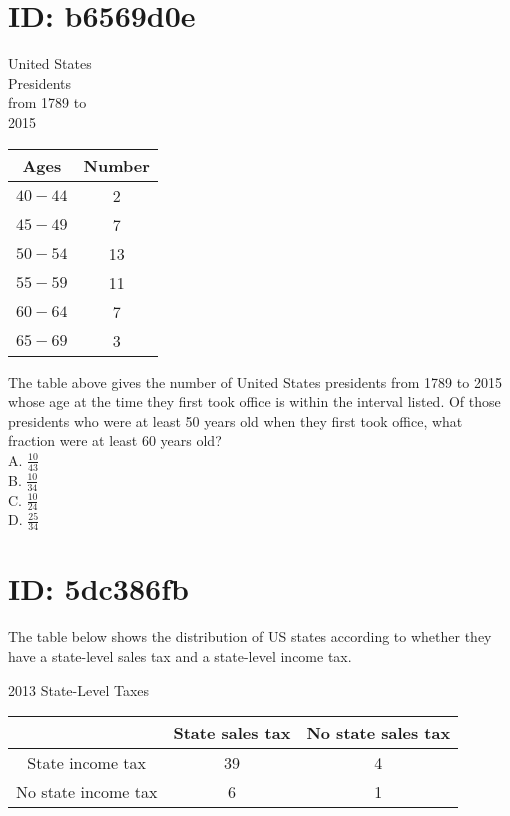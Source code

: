 \section*{ID: b6569d0e}
United States\\
Presidents\\
from 1789 to\\
2015

\begin{center}
\begin{tabular}{|c|c|}
\hline
Ages & Number \\
\hline
$40-44$ & 2 \\
\hline
$45-49$ & 7 \\
\hline
$50-54$ & 13 \\
\hline
$55-59$ & 11 \\
\hline
$60-64$ & 7 \\
\hline
$65-69$ & 3 \\
\hline
\end{tabular}
\end{center}

The table above gives the number of United States presidents from 1789 to 2015 whose age at the time they first took office is within the interval listed. Of those presidents who were at least 50 years old when they first took office, what fraction were at least 60 years old?\\
A. $\frac{10}{43}$\\
B. $\frac{10}{34}$\\
C. $\frac{10}{24}$\\
D. $\frac{25}{34}$

\section*{ID: 5dc386fb}
The table below shows the distribution of US states according to whether they have a state-level sales tax and a state-level income tax.

2013 State-Level Taxes

\begin{center}
\begin{tabular}{|c|c|c|}
\hline
 & State sales tax & No state sales tax \\
\hline
State income tax & 39 & 4 \\
\hline
No state income tax & 6 & 1 \\
\hline
\end{tabular}
\end{center}

